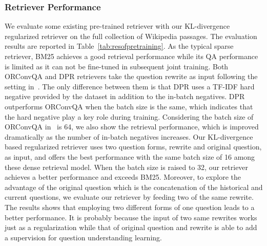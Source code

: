 \subsubsection{ Retriever Performance}\label{subsec:fa1}
We evaluate some existing pre-trained retriever with our KL-divergence regularized retriever on the full collection of Wikipedia passages. The evaluation results are reported in Table~\ref{tab:resofpretraining}. 
As the typical sparse retriever, BM25 achieves a good retrieval performance while its QA performance is limited as it can not be fine-tuned in subsequent joint training.
Both ORConvQA and DPR retrievers take the question rewrite as input following the setting in~\cite{qu2020open}. The only difference between them is that DPR uses a TF-IDF hard negative provided by the dataset in addition to the in-batch negatives. DPR outperforms ORConvQA when the batch size is the same, which indicates that the hard negative play a key role during training. Considering the batch size of ORConvQA in~\cite{qu2020open} is 64, we also show the retrieval performance, which is improved dramatically as the number of in-batch negatives increases.
Our KL-divergence based regularized retriever uses two question forms, rewrite and original question, as input, and offers the best performance with the same batch size of 16 among these dense retrieval model. When the batch size is raised to 32, our retriever achieves a better performance and exceeds BM25. 
Moreover, to explore the advantage of the original question which is the concatenation of the historical and current questions, we evaluate our retriever by feeding two of the same rewrite. The results shows that employing two different forms of one question leads to a better performance. It is probably because the input of two same rewrites works just as a regularization while that of original question and rewrite is able to add a supervision for question understanding learning.  
